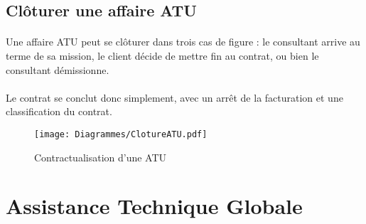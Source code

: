 \subsection{Clôturer une affaire ATU}

\paragraph{} Une affaire ATU peut se clôturer dans trois cas de figure : le consultant arrive au terme de sa mission, le client décide de mettre fin au contrat, ou bien le consultant démissionne.
\paragraph{} Le contrat se conclut donc simplement, avec un arrêt de la facturation et une classification du contrat.

\begin{figure}[H!]
	\centering
	\texttt{[image: Diagrammes/ClotureATU.pdf]}
	\caption{Contractualisation d'une ATU} 
	\label{contractATU}
\end{figure}




\section{Assistance Technique Globale}